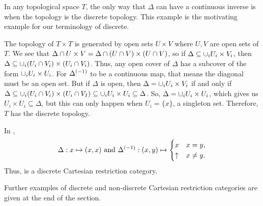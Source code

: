 \begin{example}\label{ex:topcatp-not-discrete}
  In any topological space $T$, the only way that $\Delta$ can have a continuous inverse is when the
  topology is the discrete topology. This example is the motivating example for our terminology of
  discrete.

  The topology of $T\times T$ is generated by open sets $U\times V$ where $U,V$ are open sets of
  $T$. We see that $\Delta \cap U\times V = \Delta \cap (U\cap V) \times
  (U\cap V)$, so if $\Delta \subseteq \cup_i U_i\times V_i$, then  $\Delta \subseteq
  \cup_i (U_i\cap V_i)\times( U_i\cap V_i)$. Thus, any open cover of $\Delta$ has a
  subcover of the form $\cup_i U_i\times U_i$. For ${\Delta}^{(-1)}$ to be a continuous
  map, that means the diagonal must be an open set. But if $\Delta$ is open, then $\Delta = \cup_i
  U_i\times V_i$ if and only if $\Delta \subseteq \cup_i (U_i\cap V_i) \times (U_i \cap
  V_I) \subseteq \cup_i U_i \times U_i \subseteq \Delta$. So, $\Delta = \cup_i U_i \times U_i$,
  which gives us $U_i \times U_i \subseteq \Delta$, but this can only happen when $U_i = \{x\}$, a
  singleton set.  Therefore, $T$ has the discrete topology.
\end{example}

\begin{example}\label{ex:par_is_discrete}
  In \Par,
  \[
    \Delta: x \mapsto (x,x)\text{ and }{\Delta}^{(-1)}:(x,y)\mapsto\begin{cases}
      x& x = y,\\
      \uparrow & x\ne y.
    \end{cases}
  \]
  Thus, \Par is a discrete Cartesian restriction category.
\end{example}

Further examples of discrete and non-discrete Cartesian restriction categories are given at the end
of the section.


